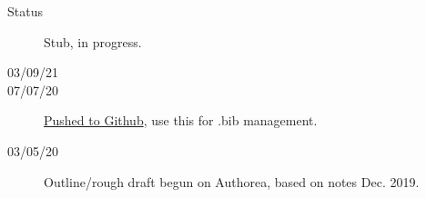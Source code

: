 \begin{description}
\item [{Status}] Stub, in progress.
\item [{03/09/21}]
\item [{07/07/20}] \href{https://github.com/phockett/Extracting-Molecular-Frame-Photoionization-Dynamics-from-Experimental-Data}{Pushed to Github}, use this for .bib management.
\item [{03/05/20}] Outline/rough draft begun on Authorea, based on notes Dec. 2019.
\end{description}